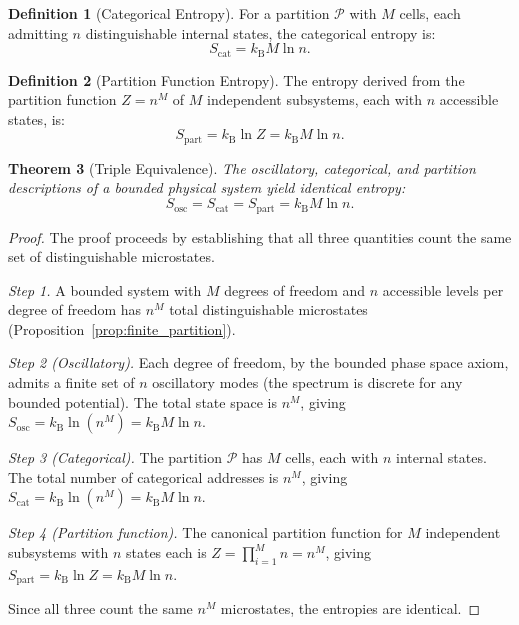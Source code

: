 \documentclass[12pt]{article}
\newtheorem{theorem}{Theorem}[section]
\theoremstyle{definition}
\newtheorem{definition}[theorem]{Definition}
\theoremstyle{remark}
\newcommand{\Sosc}{S_{\mathrm{osc}}}
\newcommand{\Scat}{S_{\mathrm{cat}}}
\newcommand{\Spart}{S_{\mathrm{part}}}
\newcommand{\kB}{k_{\mathrm{B}}}
\begin{document}
\begin{definition}[Categorical Entropy]
\label{def:cat_entropy}
For a partition $\mathcal{P}$ with $M$ cells, each admitting $n$ distinguishable internal states, the categorical entropy is:
\begin{equation}
  \Scat = \kB M \ln n.
  \label{eq:scat}
\end{equation}
\end{definition}

\begin{definition}[Partition Function Entropy]
\label{def:part_entropy}
The entropy derived from the partition function $Z = n^M$ of $M$ independent subsystems, each with $n$ accessible states, is:
\begin{equation}
  \Spart = \kB \ln Z = \kB M \ln n.
  \label{eq:spart}
\end{equation}
\end{definition}

\begin{theorem}[Triple Equivalence]
\label{thm:triple_equiv}
The oscillatory, categorical, and partition descriptions of a bounded physical system yield identical entropy:
\begin{equation}
  \Sosc = \Scat = \Spart = \kB M \ln n.
  \label{eq:triple_equiv}
\end{equation}
\end{theorem}

\begin{proof}
The proof proceeds by establishing that all three quantities count the same set of distinguishable microstates.

\emph{Step 1.} A bounded system with $M$ degrees of freedom and $n$ accessible levels per degree of freedom has $n^M$ total distinguishable microstates (Proposition~\ref{prop:finite_partition}).

\emph{Step 2 (Oscillatory).} Each degree of freedom, by the bounded phase space axiom, admits a finite set of $n$ oscillatory modes (the spectrum is discrete for any bounded potential). The total state space is $n^M$, giving $\Sosc = \kB \ln(n^M) = \kB M \ln n$.

\emph{Step 3 (Categorical).} The partition $\mathcal{P}$ has $M$ cells, each with $n$ internal states. The total number of categorical addresses is $n^M$, giving $\Scat = \kB \ln(n^M) = \kB M \ln n$.

\emph{Step 4 (Partition function).} The canonical partition function for $M$ independent subsystems with $n$ states each is $Z = \prod_{i=1}^M n = n^M$, giving $\Spart = \kB \ln Z = \kB M \ln n$.

Since all three count the same $n^M$ microstates, the entropies are identical.
\end{proof}
\end{document}
